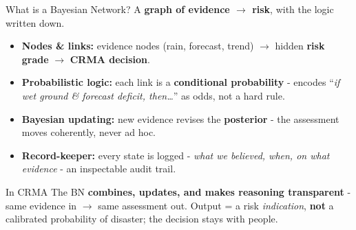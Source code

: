 \documentclass[aspectratio=3218]{beamer}
\begin{document}
\begin{frame}{What is a Bayesian Network?}
	A \textbf{graph of evidence $\rightarrow$ risk}, with the logic written down.
	\begin{itemize}
		\item \textbf{Nodes \& links:} evidence nodes (rain, forecast, trend)
			$\rightarrow$ hidden \textbf{risk grade} $\rightarrow$ \textbf{CRMA
			decision}.
		\item \textbf{Probabilistic logic:} each link is a \textbf{conditional
			probability} - encodes ``\emph{if wet ground \& forecast deficit,
			then\dots}'' as odds, not a hard rule.
		\item \textbf{Bayesian updating:} new evidence revises the
			\textbf{posterior} - the assessment moves coherently, never ad hoc.
		\item \textbf{Record-keeper:} every state is logged - \emph{what we
			believed, when, on what evidence} - an inspectable audit trail.
	\end{itemize}
	\begin{block}{In CRMA}
		The BN \textbf{combines, updates, and makes reasoning transparent} - same
		evidence in $\rightarrow$ same assessment out. Output = a risk
		\emph{indication}, \textbf{not} a calibrated probability of disaster; the
		decision stays with people.
	\end{block}
\end{frame}
\end{document}
